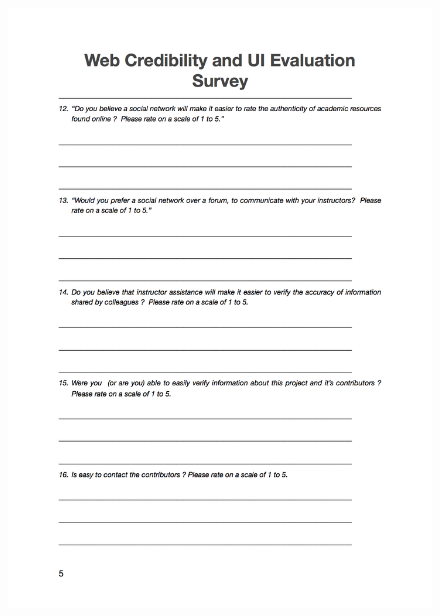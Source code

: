 \begin{figure}[H]
	\centering
	\includegraphics[scale=.7]{chapters/appendices/figures/5.png}
	\label{fig:5/6}
\end{figure}
\newpage

